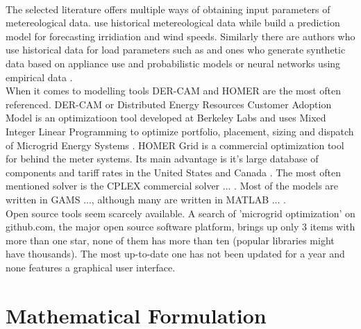 \documentclass[
	11pt,								%
	DIV10,								%
	a4paper,         					%
	oneside,							%
	headheight=20pt,					%
	footheight=20pt,					%
    parskip=full,						%
    listof=totoc,						%
	bibliography=totoc,					%
	index=totoc,						%
]{scrartcl}
\begin{document}
\\
The selected literature offers multiple ways of obtaining input parameters of metereological data. \cite{7981571} use historical metereological data while \cite{palma2013microgrid} build a prediction model for forecasting irridiation and wind speeds. Similarly there are authors who use historical data for load parameters such as \cite{7981571} and ones who generate synthetic data based on appliance use and probabilistic models \cite{zhang2013efficient}\cite{zhang2011optimal}\cite{zhang2015optimal} or neural networks using empirical data \cite{palma2013microgrid}.
\\
When it comes to modelling tools DER-CAM \cite{LAUINGER201624}\cite{ZHENG2018204}\cite{8023785} and HOMER \cite{amrollahi2017techno}\cite{ZHENG2018204}\cite{LAUINGER201624} are the most often referenced. DER-CAM or Distributed Energy Resources Customer Adoption Model is an optimizatioon tool developed at Berkeley Labs and uses Mixed Integer Linear Programming to optimize portfolio, placement, sizing and dispatch of Microgrid Energy Systems \cite{DistributedEnergyResources2018}. HOMER Grid is a commercial optimization tool for behind the meter systems. Its main advantage is it's large database of components and tariff rates in the United States and Canada \cite{HOMERGridBehindtheMeter2018}. The most often mentioned solver is the CPLEX commercial solver \cite{sechilariu2014supervision}\cite{NEMATI2018944}\cite{UMEOZOR2016672}\cite{7741704}... . Most of the models are written in GAMS \cite{silvente2015rolling}\cite{UMEOZOR2016672}\cite{CRAPARO2017135}..., although many are written in MATLAB \cite{7741704}\cite{7972908}... .
\\
Open source tools seem scarcely available. A search of 'microgrid optimization' on github.com, the major open source software platform, brings up only 3 items with more than one star, none of them has more than ten (popular libraries might have thousands)\cite{GithubSearchMicrogrid2018}. The most up-to-date one has not been updated for a year and none features a graphical user interface.

\newpage
{}	
\section{Mathematical Formulation}
\end{document}
